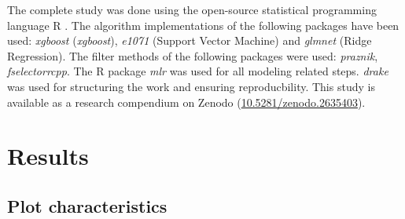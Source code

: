 \documentclass[review]{elsarticle}
\begin{document}
\noindent The complete study was done using the open-source statistical programming language R \citep{rcoreteam2018}.
The algorithm implementations of the following packages have been used: \textit{xgboost} \citep{chen2016} (\textit{xgboost}), \textit{e1071} \citep{e1071} (Support Vector Machine) and \textit{glmnet} \citep{glmnet} (Ridge Regression).
The filter methods of the following packages were used: \textit{praznik}, \textit{fselectorrcpp}.
The R package \textit{mlr} \citep{mlr} was used for all modeling related steps.
\textit{drake} was used for structuring the work and ensuring reproducbility.
This study is available as a research compendium on Zenodo (\url{10.5281/zenodo.2635403}).

\section{Results}

\subsection{Plot characteristics}




\end{document}

